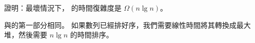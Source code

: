 \startEXERCISE
證明：最壞情況下，  的時間復雜度是 $\Omega(n\lg{n})$。
\stopEXERCISE

\startANSWER
與的第一部分相同。
如果數列已經排好序，我們需要線性時間將其轉換成最大堆，然後需要 $n\lg{n}$ 的時間排序。
\stopANSWER
